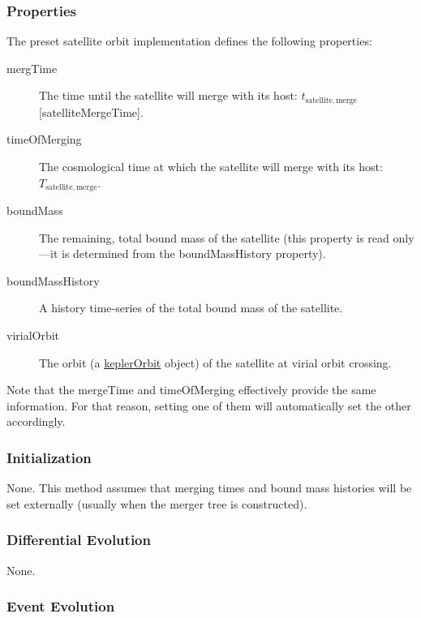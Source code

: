 \subsubsection{Properties}

The preset satellite orbit implementation defines the following properties:
\begin{description}
 \item [{\normalfont \ttfamily mergTime}] The time until the satellite will merge with its host: $t_\mathrm{satellite, merge}$ [{\normalfont \ttfamily satelliteMergeTime}].
 \item [{\normalfont \ttfamily timeOfMerging}] The cosmological time at which the satellite will merge with its host: $T_\mathrm{satellite, merge}$.
 \item [{\normalfont \ttfamily boundMass}] The remaining, total bound mass of the satellite (this property is read only---it is determined from the {\normalfont \ttfamily boundMassHistory} property).
 \item [{\normalfont \ttfamily boundMassHistory}] A history time-series of the total bound mass of the satellite.
 \item [{\normalfont \ttfamily virialOrbit}] The orbit (a \href{https://github.com/galacticusorg/galacticus/releases/download/bleeding-edge/Galacticus_Development.pdf\#sec.KeplerOrbits}{\normalfont \ttfamily keplerOrbit} object) of the satellite at virial orbit crossing.
\end{description}

Note that the {\normalfont \ttfamily mergeTime} and {\normalfont \ttfamily timeOfMerging} effectively provide the same information. For that reason, setting one of them will automatically set the other accordingly.

\subsubsection{Initialization}

None. This method assumes that merging times and bound mass histories will be set externally (usually when the merger tree is constructed).

\subsubsection{Differential Evolution}

None.

\subsubsection{Event Evolution}

